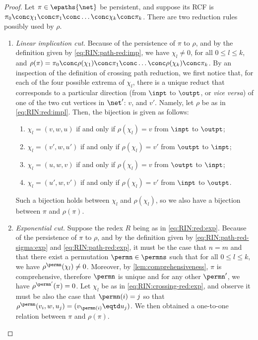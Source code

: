 \begin{proof}
Let $\pi \in \epaths{\net}$ be persistent, and suppose its RCF is
$\pi_0 \conc \chi_1 \conc \pi_1 \conc \ldots \conc \chi_k \conc \pi_k$.
There are two reduction rules possibly used by $\rho$.
\begin{enumerate}
\item
  \textit{Linear implication cut.}
  Because of the persistence of $\pi$ to $\rho$, and by the
  definition given by \autoref{eq:RIN:path-red:imp}, we have $\chi_l \neq 0$, 
  for all $0 \leq l \leq k$, and
    $\rho(\pi) =
    \pi_0 \conc \rho(\chi_1) \conc \pi_1 \conc \ldots
    \conc \rho(\chi_k) \conc \pi_k$.
  By an inspection of the definition of crossing path reduction, we first 
  notice that, for each of the four possible extrema of $\chi_l$, there is a 
  unique reduct that corresponds to a particular direction
  (from $\inpt$ to $\outpt$, or \textit{vice versa})
  of one of the two cut vertices in $\net'$: 
  $v$, and $v'$.
  Namely, let $\rho$ be as in \autoref{eq:RIN:red:impl}.
  Then, the bijection is given as follows:
  \begin{enumerate}
  \item
    $\chi_l = (v,w,u)$ if and only if
    $\rho(\chi_l) = v$ from $\inpt$ to $\outpt$;
  \item
    $\chi_l = (v',w,u')$ if and only if
    $\rho(\chi_l) = v'$ from $\outpt$ to $\inpt$;
  \item
    $\chi_l = (u,w,v)$ if and only if
    $\rho(\chi_l) = v$ from $\outpt$ to $\inpt$;
  \item
    $\chi_l = (u',w,v')$ if and only if
    $\rho(\chi_l) = v'$ from $\inpt$ to $\outpt$.
  \end{enumerate}
  Such a bijection holds between $\chi_l$ and $\rho(\chi_l)$, so we also
  have a bijection between $\pi$ and $\rho(\pi)$.
\item
  \textit{Exponential cut.}
  Suppose the redex $R$ being as in \autoref{eq:RIN:red:exp}.
  Because of the persistence of $\pi$ to $\rho$, and by the definition given by 
  \autoref{eq:RIN:path-red-sigma:exp} and \ref{eq:RIN:path-red:exp}, it must be 
  the case that $n=m$ and that there exist a permutation $\permn \in \permns$ 
  such that for all $0 \leq l \leq k$, we have $\rho^{\permn}(\chi_l) \neq 0$.
  Moreover, by \autoref{lem:comprehensiveness}, $\pi$ is 
  comprehensive, therefore 
  $\permn$ is unique and for any other $\permn'$, we have 
  $\rho^{\permn'}(\pi)=0$.
  Let $\chi_l$ be as in \autoref{eq:RIN:crossing-red:exp}, and observe it 
  must be also the case that $\permn(i)=j$ so that
  $\rho^{\permn}(v_i,w,u_j) = (v_{\permn(i)} \eqtd u_j)$.
  We then obtained a one-to-one relation between $\pi$ and $\rho(\pi)$.
\end{enumerate}
\vspace{-1.5em}
\end{proof}


